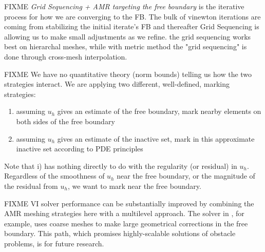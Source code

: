 \documentclass[]{interact}
\theoremstyle{plain}%
\theoremstyle{definition}
\theoremstyle{remark}
\begin{document}
FIXME \emph{Grid Sequencing + AMR targeting the free boundary} is the iterative process for how we are converging to the FB.  The bulk of vinewton iterations are coming from stabilizing the initial iterate's FB and thereafter Grid Sequencing is allowing us to make small adjustments as we refine.  the grid sequencing works best on hierarchal meshes, while with metric method the "grid sequencing" is done through cross-mesh interpolation.

FIXME We have no quantitative theory (norm bounds) telling us how the two strategies interact.  We are applying two different, well-defined, marking strategies:
\begin{enumerate}
\item assuming $u_h$ gives an estimate of the free boundary, mark nearby elements on both sides of the free boundary
\item assuming $u_h$ gives an estimate of the inactive set, mark in this approximate inactive set according to PDE principles
\end{enumerate}
Note that i) has nothing directly to do with the regularity (or residual) in $u_h$.  Regardless of the smoothness of $u_h$ near the free boundary, or the magnitude of the residual from $u_h$, we want to mark near the free boundary.

FIXME VI solver performance can be substantially improved by combining the AMR meshing strategies here with a multilevel approach.  The solver in \cite{BuelerFarrell2024}, for example, uses coarse meshes to make large geometrical corrections in the free boundary.  This path, which promises highly-scalable solutions of obstacle problems, is for future research.






\end{document}
